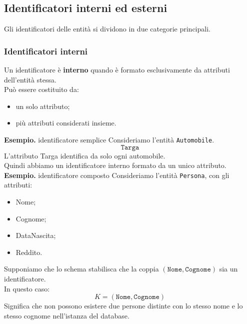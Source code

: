 \subsection*{Identificatori interni ed esterni}
Gli identificatori delle entità si dividono
in due categorie principali.
\subsubsection*{Identificatori interni}
Un identificatore è \textbf{interno} quando
è formato esclusivamente da attributi
dell'entità stessa.\\
Può essere costituito da:
\begin{itemize}
    \item un solo attributo;
    \item più attributi considerati insieme.
\end{itemize}
\noindent
\textcolor{verdeEsempio}{\textbf{Esempio. }} identificatore semplice
Consideriamo l'entità \texttt{Automobile}.
\[
\boxed{\texttt{Targa}}
\]
L'attributo Targa identifica da solo
ogni automobile.\\
Quindi abbiamo un identificatore interno
formato da un unico attributo.\\
\textcolor{verdeEsempio}{\textbf{Esempio. }} identificatore composto
Consideriamo l'entità \texttt{Persona},
con gli attributi:
\begin{itemize}
    \item Nome;
    \item Cognome;
    \item DataNascita;
    \item Reddito.
\end{itemize}
\noindent
Supponiamo che lo schema stabilisca che
la coppia $(\texttt{Nome},\texttt{Cognome})$
sia un identificatore.\\
In questo caso:\\
\[
\boxed{
K=(\texttt{Nome},\texttt{Cognome})
}
\]
Significa che non possono esistere due persone
distinte con lo stesso nome e lo stesso cognome
nell'istanza del database.
